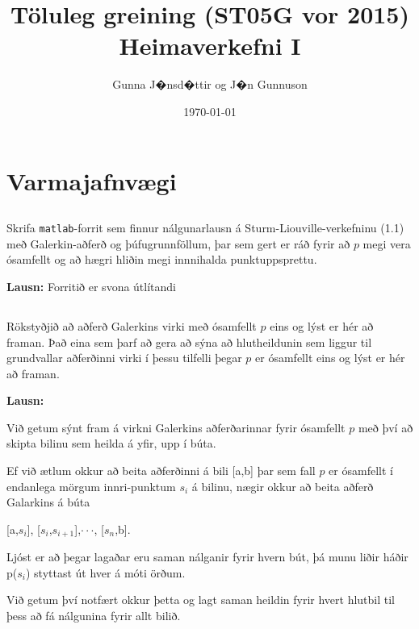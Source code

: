 \documentclass[11pt,a4paper,titlepage]{article}
\title{Töluleg greining (ST05G vor 2015)\\
Heimaverkefni I}
\date{\today}
\author{Gunna J�nsd�ttir og J�n Gunnuson}
\begin{document}
\section{Varmajafnvægi}
\subsection{}
Skrifa \verb|matlab|-forrit sem finnur nálgunarlausn á Sturm-Liouville-verkefninu (1.1) með Galerkin-aðferð og þúfugrunnföllum, þar sem gert er ráð fyrir að $p$ megi vera ósamfellt og að hægri hliðin megi innnihalda punktuppsprettu.

\textbf{Lausn:} 
Forritið er svona útlítandi







\subsection{}
Rökstyðjið að aðferð Galerkins virki með ósamfellt $p$ eins og lýst er hér að framan. Það eina sem þarf að gera að sýna að hlutheildunin sem liggur til grundvallar aðferðinni virki í þessu tilfelli þegar $p$ er ósamfellt eins og lýst er hér að framan. 
\par

\textbf{Lausn:} \par

Við getum sýnt fram á virkni Galerkins aðferðarinnar fyrir ósamfellt $p$ með því að skipta bilinu sem heilda á yfir, upp í búta.\par
Ef við ætlum okkur að beita aðferðinni á bili [a,b] þar sem fall $p$ er ósamfellt í endanlega mörgum innri-punktum $s_{i}$ á bilinu, nægir okkur að beita aðferð Galarkins á búta\par \begin{center}[a,$s_{i}$], [$s_{i}$,$s_{i+1}$],$\cdot \cdot \cdot$, [$s_{n}$,b].\end{center}
Ljóst er að þegar lagaðar eru saman nálganir fyrir hvern bút, þá munu liðir háðir p($s_{i}$) styttast út hver á móti örðum.\par
Við getum því notfært okkur þetta og lagt saman heildin fyrir hvert hlutbil til þess að fá nálgunina fyrir allt bilið.
\end{document}
